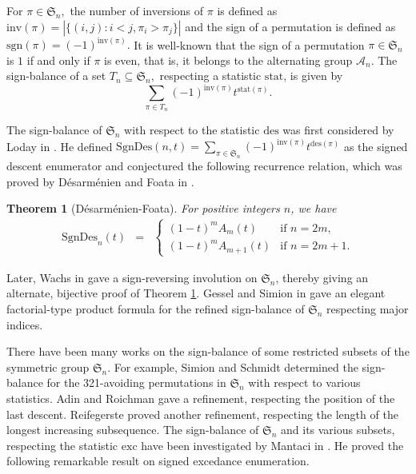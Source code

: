 \documentclass[12pt]{article}
\newcommand{\SSS}{\mathfrak{S}}
\newcommand{\AAA}{\mathcal{A}}
\newcommand{\inv}{\mathrm{inv}}
\newcommand{\des}{\mathrm{des}}
\newcommand{\exc}{\mathrm{exc}}
\newcommand{\stat}{\mathrm{stat}}
\newcommand{\sgn}{\mathrm{sgn}}
\newcommand{\SD}{ \mathrm{SgnDes}}
\newtheorem{theorem}{\bf Theorem}[section]
\begin{document}
For $\pi \in \SSS_n,$ the number of inversions of $\pi$ is defined as 
$\inv(\pi)= |\{(i,j):i<j, \pi_i> \pi_j \}| $ and the sign of a permutation is defined as $\sgn(\pi)=(-1)^{\inv(\pi)}.$ It is well-known that the sign of a permutation $\pi \in \SSS_n$ is $1$ if and only if $\pi$ is even, that is, it belongs to the alternating group $\AAA_n$. The sign-balance of a set $T_n \subseteq \SSS_n,$ respecting a statistic $\stat$, is given by 
$$ \sum _{\pi \in T_n} (-1)^{\inv(\pi)} t^{\stat(\pi)}.$$ 

The sign-balance of $\SSS_n$ with respect to the statistic $\des$ was first considered by Loday in \cite{Loday-oper}. He defined $\SD(n,t) = \sum_{\pi \in \SSS_n}(-1)^{\inv(\pi)} t ^{\des(\pi)} $ as the signed descent enumerator and conjectured the following recurrence relation, which was proved by D{\'e}sarm{\'e}nien and Foata in \cite[Theorem 1]{Foata-desar-signed-eul}. 
	
     \begin{theorem}[D{\'e}sarm{\'e}nien-Foata]
	\label{thm:Foata_desar_signed_des}
	For positive integers $n$, we have 
	 \begin{eqnarray*}
	\SD_n(t) & = & \begin{cases}
	 (1-t)^m A_m(t) & \text {if $n=2m$},\\
	 (1-t)^m A_{m+1}(t) & \text {if $n=2m+1$.}
	 \end{cases}
	 \end{eqnarray*} 
	\end{theorem}
 
Later, Wachs in \cite{Wachs-descent} gave a sign-reversing involution on $\SSS_n$, thereby giving an alternate, bijective proof of Theorem \ref{thm:Foata_desar_signed_des}. Gessel and Simion in \cite[Corollary 2]{Wachs-descent} gave an elegant factorial-type product formula for the refined sign-balance of $\SSS_n$ respecting major indices. 

There have been many works on the sign-balance of some restricted subsets of the symmetric group $\SSS_n$. For example, Simion and Schmidt \cite{Simion-Schmidt} determined the sign-balance for the 321-avoiding permutations in $\SSS_n$ with respect to various statistics. Adin and Roichman \cite{Adin-Roichman321} gave a refinement, respecting the position of the last descent. Reifegerste  \cite{Reifegerste-321-avoiding-sign} proved another refinement, respecting the length of the longest increasing subsequence. The sign-balance of $\SSS_n$ and its various subsets, respecting the statistic $\exc$ have been investigated by Mantaci in \cite{Mantaci-thesis}. He proved the following remarkable result on signed excedance enumeration.  
\end{document}
